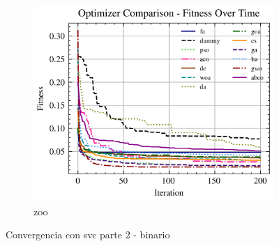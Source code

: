 \begin{figure}[htp]
    \begin{subfigure}[htp]{0.45\textwidth}
        \includegraphics[width=\textwidth]{imagenes/fitness_charts/img/binary/zoo/optimizers_fitness_svc.png}
        \caption{zoo}
    \end{subfigure}
    \caption{Convergencia con svc parte 2 - binario}
    \label{fig:convergencia_svc_2_bin}
\end{figure}

